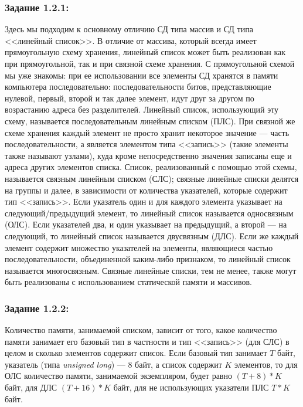 \documentclass[12pt]{article}
\begin{document}
{	\subsubsection{Задание 1.2.1:}
	\label{task_1_2_1}
	Здесь мы подходим к основному отличию СД типа массив и СД типа <<линейный список>>. В отличие от массива, который всегда имеет прямоугольную схему хранения, линейный список может быть реализован как при прямоугольной, так и при связной схеме хранения. С прямоугольной схемой мы уже знакомы: при ее использовании все элементы СД хранятся в памяти компьютера последовательно: последовательности битов, представляющие нулевой, первый, второй и так далее элемент, идут друг за другом по возрастанию адреса без разделителей. Линейный список, использующий эту схему, называется последовательным линейным списком (ПЛС). При связной же схеме хранения каждый элемент не просто хранит некоторое значение --- часть последовательности, а является элементом типа <<запись>> (такие элементы также называют узлами), куда кроме непосредственно значения записаны еще и адреса других элементов списка. Список, реализованный с помощью этой схемы, называется связным линейным списком (СЛС); связные линейные списки делятся на группы и далее, в зависимости от количества указателей, которые содержит тип <<запись>>. Если указатель один и для каждого элемента указывает на следующий/предыдущий элемент, то линейный список называется односвязным (ОЛС). Если указателей два, и один указывает на предыдущий, а второй --- на следующий, то линейный список называется двусвязным (ДЛС). Если же каждый элемент содержит множество указателей на элементы, являющиеся частью последовательности, объединенной каким-либо признаком, то линейный список называется многосвязным. Связные линейные списки, тем не менее, также могут быть реализованы с использованием статической памяти и массивов.
	\subsubsection{Задание 1.2.2:}
	\label{task_1_2_2}
	Количество памяти, занимаемой списком, зависит от того, какое количество памяти занимает его базовый тип в частности и тип <<запись>> (для СЛС) в целом и сколько элементов содержит список. Если базовый тип занимает $T$ байт, указатель (типа {\it unsigned long}) --- 8 байт, а список содержит $K$ элементов, то для ОЛС количество памяти, занимаемой экземпляром, будет равно $(T+8)*K$ байт, для ДЛС $(T+16)*K$ байт, для не использующих указатели ПЛС $T*K$ байт.
	
}
\end{document}
